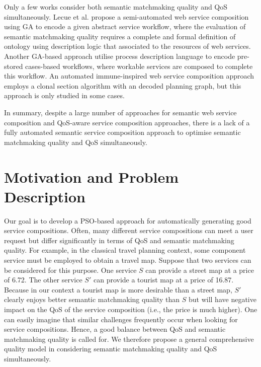 \documentclass{llncs}
\begin{document}
Only a few works \cite{fanjiang2014semantic,lecue2009optimizing,pop2009immune} consider both semantic matchmaking quality and QoS simultaneously. Lecue et al. \cite{lecue2009optimizing} propose a semi-automated web service composition using GA to encode a given abstract service workflow, where the evaluation of semantic matchmaking quality requires a complete and formal definition of ontology using description logic that associated to the resources of web services. Another GA-based approach \cite{fanjiang2014semantic} utilise process description language to encode pre-stored cases-based workflows, where workable services are composed to complete this workflow. An automated immune-inspired web service composition approach \cite{pop2009immune} employs a clonal section algorithm with an decoded planning graph, but this approach is only studied in some cases.

In summary, despite a large number of approaches for semantic web service composition and QoS-aware service composition approaches, there is a lack of a fully automated semantic service composition approach to optimise semantic matchmaking quality and QoS simultaneously. 

\section{Motivation and Problem Description}\label{Motivation and Problem Description}\label{Motivation}\label{problemDes}\label{qualityModel}\label{Comprehensive_Quality_Model}\label{qualityModel}

Our goal is to develop a PSO-based approach for automatically generating good service compositions. Often, many different service compositions can meet a user request but differ significantly in terms of QoS and semantic matchmaking quality. For example, in the classical travel planning context, some component service must be employed to obtain a travel map. Suppose that two services can be considered for this purpose. One service $S$ can provide a street map at a price of 6.72. The other service $S'$ can provide a tourist map at a price of 16.87. Because in our context a tourist map is more desirable than a street map, $S'$ clearly enjoys better semantic matchmaking quality than $S$ but will have negative impact on the QoS of the service composition (i.e., the price is much higher). One can easily imagine that similar challenges frequently occur when looking for service compositions. Hence, a good balance between QoS and semantic matchmaking quality is called for. We therefore propose a general comprehensive quality model in considering semantic matchmaking quality and QoS simultaneously.
\end{document}
